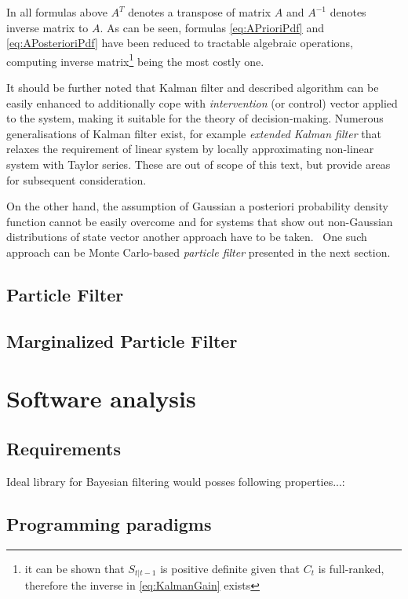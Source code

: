 \documentclass[a4paper,12pt,oneside]{report}
\newcommand{\pdf}{probability density function}
\begin{document}
In all formulas above \(A^T\) denotes a transpose of matrix \(A\) and \(A^{-1}\) denotes inverse
matrix to \(A\). As can be seen, formulas \eqref{eq:APrioriPdf} and \eqref{eq:APosterioriPdf} have
been reduced to tractable algebraic operations, computing inverse matrix\footnote{it can be shown
that \(S_{t|t-1}\) is positive definite given that \(C_t\) is full-ranked,
therefore the inverse in \eqref{eq:KalmanGain} exists} being the most costly one.

It should be further noted that Kalman filter and described algorithm can be easily enhanced to
additionally cope with \emph{intervention} (or control) vector applied to the system, making it
suitable for the theory of decision-making. Numerous generalisations of Kalman filter exist, for
example \emph{extended Kalman filter} that relaxes the requirement of linear system by locally
approximating non-linear system with Taylor series. These are out of scope of this
text, but provide areas for subsequent consideration.

On the other hand, the assumption of Gaussian a posteriori {\pdf} cannot be easily overcome and for
systems that show out non-Gaussian distributions of state vector another approach have to be
taken.~\cite{AruMasGor:02} One such approach can be Monte Carlo-based \emph{particle filter}
presented in the next section.

\section{Particle Filter}

\section{Marginalized Particle Filter}


\chapter{Software analysis}

\section{Requirements}

Ideal library for Bayesian filtering would posses following properties...:

\section{Programming paradigms}
\end{document}
